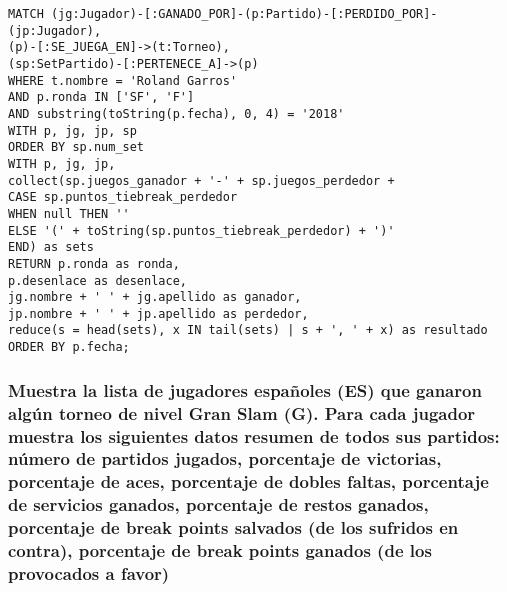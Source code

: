 \begin{lstlisting}[language=Cypher]
MATCH (jg:Jugador)-[:GANADO_POR]-(p:Partido)-[:PERDIDO_POR]-(jp:Jugador),
(p)-[:SE_JUEGA_EN]->(t:Torneo),
(sp:SetPartido)-[:PERTENECE_A]->(p)
WHERE t.nombre = 'Roland Garros'
AND p.ronda IN ['SF', 'F']
AND substring(toString(p.fecha), 0, 4) = '2018'
WITH p, jg, jp, sp
ORDER BY sp.num_set
WITH p, jg, jp,
collect(sp.juegos_ganador + '-' + sp.juegos_perdedor +
CASE sp.puntos_tiebreak_perdedor
WHEN null THEN ''
ELSE '(' + toString(sp.puntos_tiebreak_perdedor) + ')'
END) as sets
RETURN p.ronda as ronda,
p.desenlace as desenlace,
jg.nombre + ' ' + jg.apellido as ganador,
jp.nombre + ' ' + jp.apellido as perdedor,
reduce(s = head(sets), x IN tail(sets) | s + ', ' + x) as resultado
ORDER BY p.fecha;
\end{lstlisting}





\subsubsection{Muestra la lista de jugadores españoles (ES) que ganaron algún torneo de nivel Gran Slam (G). Para cada jugador muestra los siguientes datos resumen de todos sus partidos: número de partidos jugados, porcentaje de victorias, porcentaje de aces, porcentaje de dobles faltas, porcentaje de servicios ganados, porcentaje de restos ganados, porcentaje de break points salvados (de los sufridos en contra), porcentaje de break points ganados (de los provocados a favor)}

